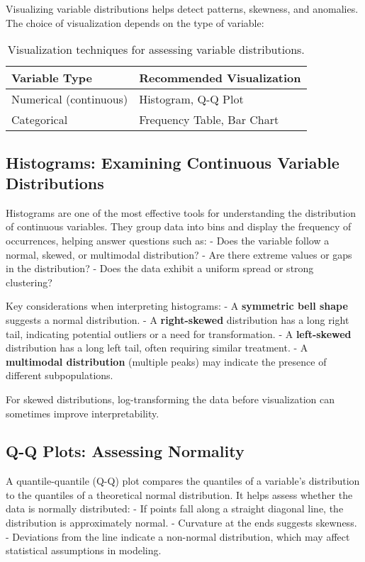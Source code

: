 \documentclass[12pt,openany]{book}
\begin{document}
Visualizing variable distributions helps detect patterns, skewness, and anomalies. The choice of visualization depends on the type of variable:

\begin{table}[h]
    \centering
    \begin{tabular}{|l|l|}
        \hline
        \textbf{Variable Type} & \textbf{Recommended Visualization} \\
        \hline
        Numerical (continuous) & Histogram, Q-Q Plot \\
        Categorical & Frequency Table, Bar Chart \\
        \hline
    \end{tabular}
    \caption{Visualization techniques for assessing variable distributions.}
    \label{tab:viz_variable_distributions}
\end{table}

\subsection{Histograms: Examining Continuous Variable Distributions}

Histograms are one of the most effective tools for understanding the distribution of continuous variables. They group data into bins and display the frequency of occurrences, helping answer questions such as:
- Does the variable follow a normal, skewed, or multimodal distribution?
- Are there extreme values or gaps in the distribution?
- Does the data exhibit a uniform spread or strong clustering?

Key considerations when interpreting histograms:
- A \textbf{symmetric bell shape} suggests a normal distribution.
- A \textbf{right-skewed} distribution has a long right tail, indicating potential outliers or a need for transformation.
- A \textbf{left-skewed} distribution has a long left tail, often requiring similar treatment.
- A \textbf{multimodal distribution} (multiple peaks) may indicate the presence of different subpopulations.

For skewed distributions, log-transforming the data before visualization can sometimes improve interpretability.

\subsection{Q-Q Plots: Assessing Normality}

A quantile-quantile (Q-Q) plot compares the quantiles of a variable’s distribution to the quantiles of a theoretical normal distribution. It helps assess whether the data is normally distributed:
- If points fall along a straight diagonal line, the distribution is approximately normal.
- Curvature at the ends suggests skewness.
- Deviations from the line indicate a non-normal distribution, which may affect statistical assumptions in modeling.
\end{document}
